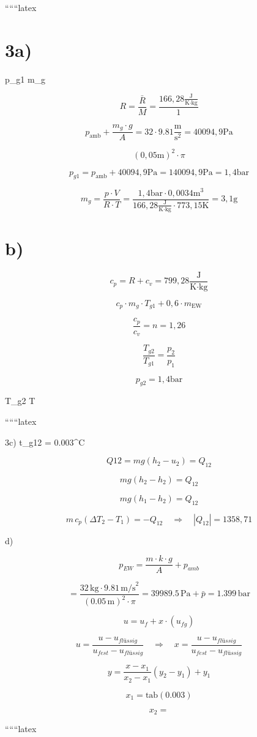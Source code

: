
``````latex


\section*{3a)}
 p_{g1} \quad m_g

\[
R = \frac{\bar{R}}{M} = \frac{166,28 \frac{\text{J}}{\text{K} \cdot \text{kg}}}{1}
\]

\[
p_{\text{amb}} + \frac{m_g \cdot g}{A} = 32 \cdot 9.81 \frac{\text{m}}{\text{s}^2} = 40 094,9 \text{Pa}
\]

\[
(0,05 \text{m})^2 \cdot \pi
\]

\[
p_{g1} = p_{\text{amb}} + 40 094,9 \text{Pa} = 140 094,9 \text{Pa} = 1,4 \text{bar}
\]

\[
m_g = \frac{p \cdot V}{R \cdot T} = \frac{1,4 \text{bar} \cdot 0,0034 \text{m}^3}{166,28 \frac{\text{J}}{\text{K} \cdot \text{kg}} \cdot 773,15 \text{K}} = 3,1 \text{g}
\]

\section*{b)}
\[
c_p = R + c_v = 799,28 \frac{\text{J}}{\text{K} \cdot \text{kg}}
\]

\[
c_p \cdot m_g \cdot T_{g1} + 0,6 \cdot m_{\text{EW}}
\]

\[
\frac{c_p}{c_v} = n = 1,26
\]

\[
\frac{T_{g2}}{T_{g1}} = \frac{p_2}{p_1}
\]


\[
p_{g2} = 1,4 \text{bar}
\]

 T_{g2}  T 

``````latex


3c) \quad t_{g12} = 0.003^\circ C

\[
Q12 = mg(h_2 - u_2) = Q_{12}
\]

\[
mg(h_2 - h_2) = Q_{12}
\]

\[
mg(h_1 - h_2) = Q_{12}
\]

\[
m \, c_p (\Delta T_2 - T_1) = -Q_{12} \quad \Rightarrow \quad |Q_{12}| = 1358,71
\]

d)

\[
p_{EW} = \frac{m \cdot k \cdot g}{A} + p_{amb}
\]

\[
= \frac{32 \, \text{kg} \cdot 9.81 \, \text{m/s}^2}{(0.05 \, \text{m})^2 \cdot \pi} = 39989.5 \, \text{Pa} + \bar{p} = 1.399 \, \text{bar}
\]

\[
u = u_f + x \cdot (u_{fg})
\]

\[
u = \frac{u - u_{flüssig}}{u_{fest} - u_{flüssig}} \quad \Rightarrow \quad x = \frac{u - u_{flüssig}}{u_{fest} - u_{flüssig}}
\]


\[
y = \frac{x - x_1}{x_2 - x_1} (y_2 - y_1) + y_1
\]

\[
x_1 = \text{tab}(0.003)
\]

\[
x_2 = 
\]

``````latex


